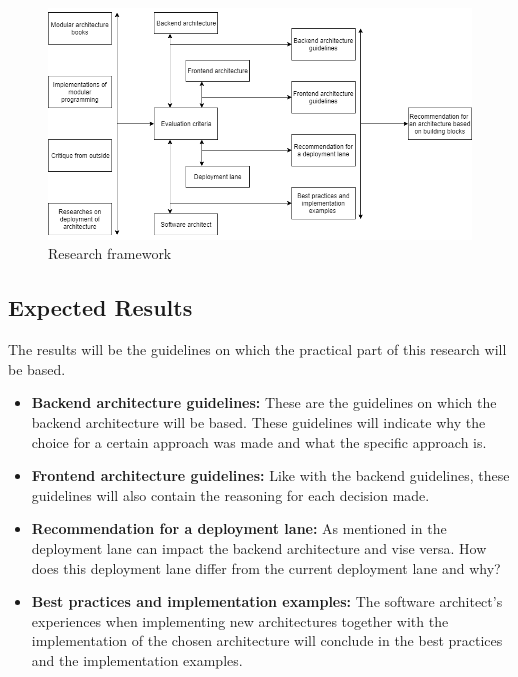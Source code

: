 \begin{figure}[H]
	\includegraphics[width=\linewidth]{research_framework.png}
	\caption{Research framework}
\end{figure}

\subsection{Expected Results}
\label{sec:ExpectedResults}

The results will be the guidelines on which the practical part of this research will be based.

\begin{itemize}
	\item \textbf{Backend architecture guidelines: } These are the guidelines on which the backend architecture will be based. These guidelines will indicate why the choice for a certain approach was made and what the specific approach is.

	\item \textbf{Frontend architecture guidelines: } Like with the backend guidelines, these guidelines will also contain the reasoning for each decision made.

	\item \textbf{Recommendation for a deployment lane: } As mentioned in  the deployment lane can impact the backend architecture and vise versa. How does this deployment lane differ from the current deployment lane and why?

	\item \textbf{Best practices and implementation examples: } The software architect's experiences when implementing new architectures together with the implementation of the chosen architecture will conclude in the best practices and the implementation examples.
\end{itemize}

